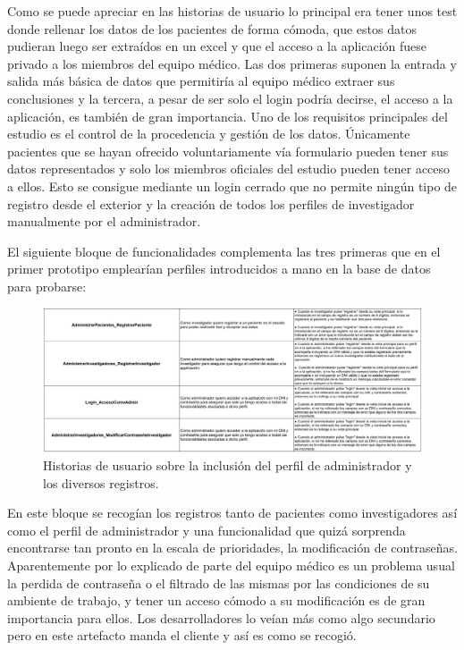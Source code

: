 Como se puede apreciar en las historias de usuario lo principal era tener unos test donde rellenar los datos de los pacientes de forma cómoda, que estos datos pudieran luego ser extraídos en un excel y que el acceso a la aplicación fuese privado a los miembros del equipo médico. Las dos primeras suponen la entrada y salida más básica de datos que permitiría al equipo médico extraer sus conclusiones y la tercera, a pesar de ser solo el login podría decirse, el acceso a la aplicación, es también de gran importancia. Uno de los requisitos principales del estudio es el control de la procedencia y gestión de los datos. Únicamente pacientes que se hayan ofrecido voluntariamente vía formulario pueden tener sus datos representados y solo los miembros oficiales del estudio pueden tener acceso a ellos. Esto se consigue mediante un login cerrado que no permite ningún tipo de registro desde el exterior y la creación de todos los perfiles de investigador manualmente por el administrador.
\newline

El siguiente bloque de funcionalidades complementa las tres primeras que en el primer prototipo emplearían perfiles introducidos a mano en la base de datos para probarse:
\newline

 \begin{figure}[h]
    \centering
     \includegraphics[width=1\textwidth]{images/historiasUsuario-2.jpg}
    \caption{Historias de usuario sobre la inclusión del perfil de administrador y los diversos registros.}
\end{figure}


En este bloque se recogían los registros tanto de pacientes como investigadores así como el perfil de administrador y una funcionalidad que quizá sorprenda encontrarse tan pronto en la escala de prioridades, la modificación de contraseñas. Aparentemente por lo explicado de parte del equipo médico es un problema usual la perdida de contraseña o el filtrado de las mismas por las condiciones de su ambiente de trabajo, y tener un acceso cómodo a su modificación es de gran importancia para ellos. Los desarrolladores lo veían más como algo secundario pero en este artefacto manda el cliente y así es como se recogió.
\newpage

